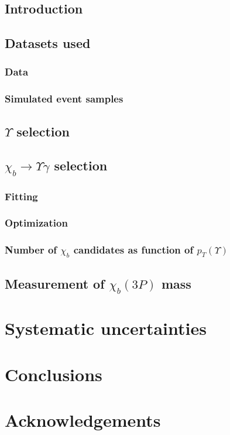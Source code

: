 \documentclass[12pt,a4paper]{article}
\begin{document}
\subsection{Introduction}
\subsection{Datasets used}
\subsubsection{Data}
\subsubsection{Simulated event samples}
\subsection{$\Upsilon$ selection}

\subsection{$\chi_{b} \rightarrow \Upsilon \gamma$ selection}
\subsubsection{Fitting}
\subsubsection{Optimization}
\subsubsection{Number of $\chi_{b}$ candidates as function of $p_{T} (\Upsilon)$}

\subsection{Measurement of $\chi_{b} (3P)$ mass}
\section{Systematic uncertainties}
\section{Conclusions}

\section*{Acknowledgements}
\end{document}
